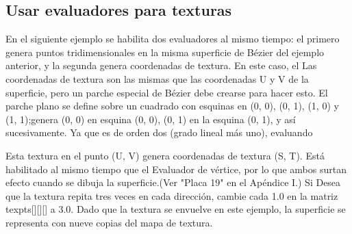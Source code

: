 


\subsection{Usar evaluadores para texturas}


En el siguiente ejemplo se  habilita dos evaluadores al mismo tiempo: el primero genera puntos tridimensionales en
la misma superficie de Bézier del ejemplo anterior, y la segunda genera coordenadas de textura. En este caso, el
Las coordenadas de textura son las mismas que las coordenadas U y V de la superficie, pero un parche especial de Bézier
debe crearse para hacer esto.
El parche plano se define sobre un cuadrado con esquinas en (0, 0), (0, 1), (1, 0) y (1, 1);genera (0, 0) en
esquina (0, 0), (0, 1) en la esquina (0, 1), y así sucesivamente. Ya que es de orden dos (grado lineal más uno), evaluando

Esta textura en el punto (U, V) genera coordenadas de textura (S, T). Está habilitado al mismo tiempo que el
Evaluador de vértice, por lo que ambos surtan efecto cuando se dibuja la superficie.(Ver "Placa 19" en el Apéndice I.) Si
Desea que la textura repita tres veces en cada dirección, cambie cada 1.0 en la matriz texpts[][][] a 3.0.
Dado que la textura se envuelve en este ejemplo, la superficie se representa con nueve copias del mapa de textura.



